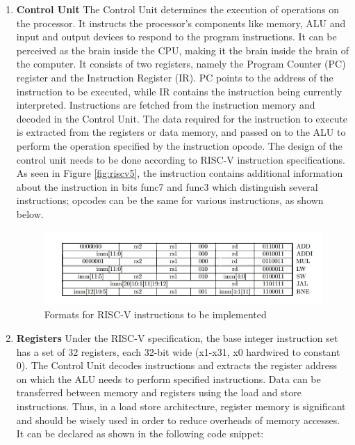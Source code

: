 \begin{enumerate}
\item \textbf{Control Unit} \newline
The Control Unit determines the execution of operations on the processor. It instructs the processor's components like memory, ALU and input and output devices to respond to the program instructions. It can be perceived as the brain inside the CPU, making it the brain inside the brain of the computer. \newline\newline
It consists of two registers, namely the Program Counter (PC) register and the Instruction Register (IR). PC points to the address of the instruction to be executed, while IR contains the instruction being currently interpreted. Instructions are fetched from the instruction memory and decoded in the Control Unit. The data required for the instruction to execute is extracted from the registers or data memory, and passed on to the ALU to perform the operation specified by the instruction opcode. \newline\newline
The design of the control unit needs to be done according to RISC-V instruction specifications. As seen in Figure \ref{fig:riscv5}, the instruction contains additional information about the instruction in bits func7 and func3 which distinguish several instructions; opcodes can be the same for various instructions, as shown below.

\begin{figure}[h!]
\includegraphics[width=\linewidth]{figures/RISCV_Instruction_Formats.jpg}
\caption{Formats for RISC-V instructions to be implemented \cite{riscv_isa_manual}}
\label{fig:riscv6}
\end{figure}

\item \textbf{Registers} \newline
Under the RISC-V specification, the base integer instruction set has a set of 32 registers, each 32-bit wide (x1-x31, x0 hardwired to constant 0). The Control Unit decodes instructions and extracts the register address on which the ALU needs to perform specified instructions. Data can be transferred between memory and registers using the load and store instructions. Thus, in a load store architecture, register memory is significant and should be wisely used in order to reduce overheads of memory accesses. It can be declared as shown in the following code snippet:


\end{enumerate}
